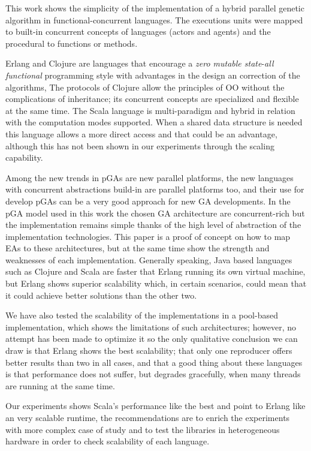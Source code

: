 
This work shows the simplicity of the implementation  of a hybrid
parallel genetic algorithm in functional-concurrent languages. The
executions units were mapped to built-in concurrent concepts of languages
(actors and agents) and the procedural to functions or methods. 

Erlang and Clojure are languages that encourage a \emph{zero mutable
  state}-\emph{all functional} programming style with advantages in
the design an correction of the algorithms, The protocols of Clojure
allow the principles of OO without the complications of inheritance;
its concurrent concepts  are specialized and flexible at the same
time. The Scala language is multi-paradigm and hybrid in relation with
the computation modes supported. When a shared data structure is
needed this language allows a more direct access and that could be an
advantage, although this has not been shown in our experiments through
the scaling capability. 

Among the new trends in pGAs are new parallel platforms, the new
languages with concurrent abstractions build-in are parallel platforms
too, and their use for develop pGAs can be a very good approach for
new GA developments. In the pGA model used in this work the chosen GA
architecture are concurrent-rich but the implementation remains simple
thanks of the high level of abstraction of the implementation
technologies. This paper is a proof of concept on how to map EAs to
these architectures, but at the same time show the strength and
weaknesses of each implementation. Generally speaking, Java based
languages such as Clojure and Scala are faster that Erlang running its
own virtual machine, but Erlang shows superior scalability which, in
certain scenarios, could mean that it could achieve better solutions
than the other two. 

We have also tested the scalability of the implementations in a
pool-based implementation, which shows the limitations of such
architectures; however, no attempt has been made to optimize it so the
only qualitative conclusion we can draw is that Erlang shows the best
scalability; that only one reproducer offers better results than two
in all cases, and that a good thing about these languages is that
performance does not suffer, but degrades gracefully, when many
threads are running at the same time. 

Our experiments shows Scala's performance like the best and point to Erlang like an very scalable runtime, the recommendations are to enrich the experiments with more complex case of study and to test the libraries in heterogeneous hardware in order to check scalability of each language.
